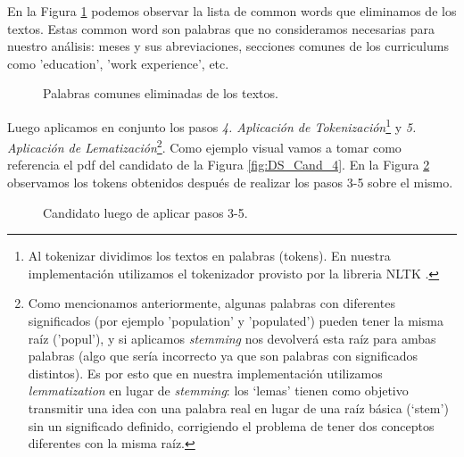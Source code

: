 \documentclass[12pt,a4paper]{article}
\begin{document}
\begin{sloppypar}
En la Figura \ref{fig:common_text} podemos observar la lista de common words que eliminamos de los textos. Estas common word son palabras que no consideramos necesarias para nuestro análisis: meses y sus abreviaciones, secciones comunes de los curriculums como 'education', 'work experience', etc. 
    
\begin{figure}[H] 
 \centering
 \noindent{}
 \caption{Palabras comunes eliminadas de los textos.} 
 \label{fig:common_text}
\end{figure}

Luego aplicamos en conjunto los pasos \textit{4. Aplicación de Tokenización}\footnote{Al tokenizar dividimos los textos en palabras (tokens). En nuestra implementación utilizamos el tokenizador provisto por la libreria NLTK .} y \textit{5. Aplicación de Lematización}\footnote{Como mencionamos anteriormente, algunas palabras con diferentes significados (por ejemplo 'population' y 'populated') pueden tener la misma raíz ('popul'), y si aplicamos \textit{stemming} nos devolverá esta raíz para ambas palabras (algo que sería incorrecto ya que son palabras con significados distintos). Es por esto que en nuestra implementación utilizamos \textit{lemmatization} en lugar de \textit{stemming}: los ‘lemas’ tienen como objetivo transmitir una idea con una palabra real en lugar de una raíz básica (‘stem’) sin un significado definido, corrigiendo el problema de tener dos conceptos diferentes con la misma raíz.}. Como ejemplo visual vamos a tomar como referencia el pdf del candidato de la Figura \ref{fig:DS_Cand_4}. En la Figura \ref{fig:tokens_obt} observamos los tokens obtenidos después de realizar los pasos 3-5 sobre el mismo. 

\begin{figure}[H] 
 \centering
 \noindent{}
 \caption{Candidato luego de aplicar pasos 3-5.} 
 \label{fig:tokens_obt}
\end{figure}


\end{sloppypar}
\end{document}
